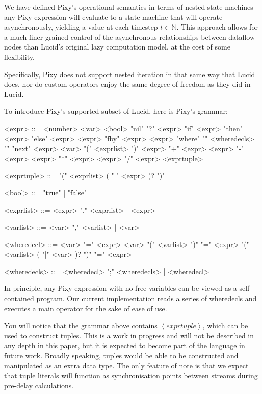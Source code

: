 \documentclass{scrartcl}
\begin{document}
    We have defined Pixy's operational semantics in terms of nested state machines - any Pixy expression will evaluate to a state machine that will operate asynchronously, yielding a value at each timestep $t \in \mathbb{N}$.
    This approach allows for a much finer-grained control of the asynchronous relationships between dataflow nodes than Lucid's original lazy computation model, at the cost of some flexibility.
    
    Specifically, Pixy does not support nested iteration in that same way that Lucid does, nor do custom operators enjoy the same degree of freedom as they did in Lucid.
    
    To introduce Pixy's supported subset of Lucid, here is Pixy's grammar:
    
    \begin{grammar}
        <expr> ::= <number>
        \alt <var>
        \alt <bool>
        \alt "nil"
        \alt "?" <expr>
        \alt "if" <expr> "then" <expr> "else" <expr>
        \alt <expr> "fby" <expr>
        \alt <expr> "where" "{" <wheredecls> "}"
        \alt "next" <expr>
        \alt <var> "(" <exprlist> ")"
        \alt <expr> "+" <expr>
        \alt <expr> "-" <expr>
        \alt <expr> "*" <expr>
        \alt <expr> "/" <expr>
        \alt <exprtuple>
        
        <exprtuple> ::= "(" <exprlist> ( "|" <expr> )? ")"
        
        <bool> ::= "true" | "false"
        
        <exprlist> ::= <expr> "," <exprlist> | <expr>
        
        <varlist> ::= <var> "," <varlist> | <var>
        
        <wheredecl> ::= <var> "=" <expr> 
        \alt <var> "(" <varlist> ")" "=" <expr>
        \alt "(" <varlist> ( "|" <var> )? ")" "=" <expr>
        
        <wheredecls> ::= <wheredecl> ";" <wheredecls> | <wheredecl>
    \end{grammar}

    In principle, any Pixy expression with no free variables can be viewed as a self-contained program. Our current implementation reads a series of wheredecls and executes a main operator for the sake of ease of use.
    
    You will notice that the grammar above contains $\left<exprtuple \right>$, which can be used to construct tuples. This is a work in progress and will not be described in any depth in this paper, but it is expected to become part of the language in future work. Broadly speaking, tuples would be able to be constructed and manipulated as an extra data type. The only feature of note is that we expect that tuple literals will function as synchronisation points between streams during pre-delay calculations.
    
\end{document}
